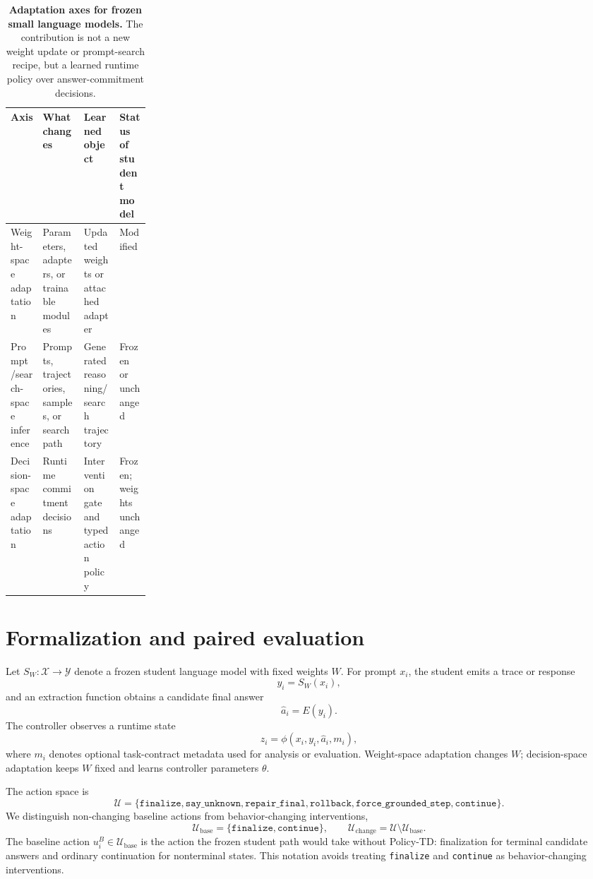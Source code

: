 \documentclass[11pt]{article}
\begin{document}
\begin{table}[H]
\centering
\small
\caption{\textbf{Adaptation axes for frozen small language models.} The contribution is not a new weight update or prompt-search recipe, but a learned runtime policy over answer-commitment decisions.}
\label{tab:axes}
\begin{tabularx}{\linewidth}{p{0.23\linewidth}Y Y Y}
\toprule
Axis & What changes & Learned object & Status of student model \\
\midrule
Weight-space adaptation & Parameters, adapters, or trainable modules & Updated weights or attached adapter & Modified \\
Prompt/search-space inference & Prompts, trajectories, samples, or search path & Generated reasoning/search trajectory & Frozen or unchanged \\
Decision-space adaptation & Runtime commitment decisions & Intervention gate and typed action policy & Frozen; weights unchanged \\
\bottomrule
\end{tabularx}
\end{table}

\section{Formalization and paired evaluation}\label{sec:formal}
Let \(S_W : \mathcal{X} \rightarrow \mathcal{Y}\) denote a frozen student language model with fixed weights \(W\). For prompt \(x_i\), the student emits a trace or response
\begin{equation}
    y_i = S_W(x_i),
\end{equation}
and an extraction function obtains a candidate final answer
\begin{equation}
    \hat{a}_i = E(y_i).
\end{equation}
The controller observes a runtime state
\begin{equation}
    z_i = \phi(x_i, y_i, \hat{a}_i, m_i),
\end{equation}
where \(m_i\) denotes optional task-contract metadata used for analysis or evaluation. Weight-space adaptation changes \(W\); decision-space adaptation keeps \(W\) fixed and learns controller parameters \(\theta\).

The action space is
\begin{equation}
\mathcal{U}=\{\texttt{finalize},\texttt{say\_unknown},\texttt{repair\_final},\texttt{rollback},\texttt{force\_grounded\_step},\texttt{continue}\}.
\end{equation}
We distinguish non-changing baseline actions from behavior-changing interventions,
\begin{equation}
\mathcal{U}_{\mathrm{base}}=\{\texttt{finalize},\texttt{continue}\},\qquad
\mathcal{U}_{\mathrm{change}}=\mathcal{U}\setminus\mathcal{U}_{\mathrm{base}}.
\end{equation}
The baseline action \(u_i^B\in\mathcal{U}_{\mathrm{base}}\) is the action the frozen student path would take without Policy-TD: finalization for terminal candidate answers and ordinary continuation for nonterminal states. This notation avoids treating \texttt{finalize} and \texttt{continue} as behavior-changing interventions.
\end{document}
